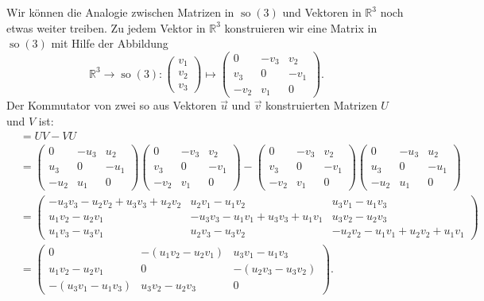 Wir können die Analogie zwischen Matrizen in $\operatorname{so}(3)$ und
Vektoren in $\mathbb R^3$ noch etwas weiter treiben. Zu jedem Vektor
in $\mathbb R^3$ konstruieren wir eine Matrix in $\operatorname{so}(3)$
mit Hilfe der Abbildung
\[
\mathbb R^3\to\operatorname{so}(3)
:
\begin{pmatrix}v_1\\v_2\\v_3\end{pmatrix}
\mapsto
\begin{pmatrix}
  0 &-v_3& v_2\\
 v_3&  0 &-v_1\\
-v_2& v_1&  0
\end{pmatrix}.
\]
Der Kommutator von zwei so aus Vektoren $\vec u$ und $\vec v$
konstruierten Matrizen $U$ und $V$ ist:
\begin{align*}
[U,V]
&=
UV-VU
\\
&=
\begin{pmatrix}
  0 &-u_3& u_2\\
 u_3&  0 &-u_1\\
-u_2& u_1&  0
\end{pmatrix}
\begin{pmatrix}
  0 &-v_3& v_2\\
 v_3&  0 &-v_1\\
-v_2& v_1&  0
\end{pmatrix}
-
\begin{pmatrix}
  0 &-v_3& v_2\\
 v_3&  0 &-v_1\\
-v_2& v_1&  0
\end{pmatrix}
\begin{pmatrix}
  0 &-u_3& u_2\\
 u_3&  0 &-u_1\\
-u_2& u_1&  0
\end{pmatrix}
\\
&=
\begin{pmatrix}
-u_3v_3-u_2v_2 + u_3v_3 + u_2v_2
        & u_2v_1 - u_1v_2
                & u_3v_1 - u_1v_3
\\
u_1v_2 - u_2v_1
        & -u_3v_3-u_1v_1 + u_3v_3+u_1v_1
                & u_3v_2 - u_2v_3
\\
u_1v_3 - u_3v_1
        & u_2v_3 - u_3v_2
                &-u_2v_2-u_1v_1+ u_2v_2+u_1v_1
\end{pmatrix}
\\
&=
\begin{pmatrix}
0
        &-(u_1v_2 - u_2v_1)
                &u_3v_1-u_1v_3
\\
u_1v_2 - u_2v_1
        & 0
                &-(u_2v_3 - u_3v_2)
\\
-(u_3v_1 - u_1v_3)
        &   u_3v_2 - u_2v_3
                & 0
\end{pmatrix}.
\end{align*}
